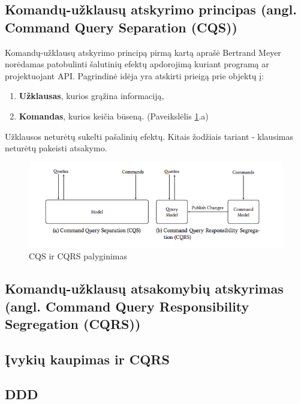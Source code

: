 \subsection{Komandų-užklausų atskyrimo principas (angl. Command Query Separation (CQS))}

Komandų-užklausų atskyrimo principą pirmą kartą aprašė Bertrand Meyer \cite{Meyer:1988:OSC:534929} norėdamas patobulinti šalutinių efektų apdorojimą kuriant programą ar projektuojant API. Pagrindinė idėja yra atskirti prieigą prie objektų į:

\begin{enumerate}

  \item \textbf{Užklausas}, kurios grąžina informaciją,

  \item \textbf{Komandas}, kurios keičia būseną. (Paveikslėlis \ref{img:cqs}.a)

\end{enumerate}

Užklausos neturėtų sukelti pašalinių efektų. Kitais žodžiais tariant - klausimas neturėtų pakeisti atsakymo.

\begin{figure}[H]
    \centering
    \includegraphics[scale=0.8]{img/cqs}
    \caption{CQS ir CQRS palyginimas}
    \label{img:cqs}
\end{figure}

\subsection{Komandų-užklausų atsakomybių atskyrimas (angl. Command Query Responsibility Segregation (CQRS))}

\subsection{Įvykių kaupimas ir CQRS}

\subsection{DDD}

